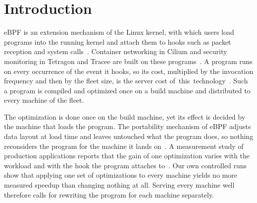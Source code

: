 \section{Introduction}

eBPF is an extension mechanism of the Linux kernel, with which users load programs into the running kernel and attach them to hooks such as packet reception and system calls~\cite{gbadamosi2024ebpf}.
Container networking in Cilium and security monitoring in Tetragon and Tracee are built on these programs~\cite{cilium,tetragon,doerrfeld2026ebpf}.
A program runs on every occurrence of the event it hooks, so its cost, multiplied by the invocation frequency and then by the fleet size, is the server cost of~this~technology~\cite{xu2021synthesizing,doerrfeld2026ebpf}.
Such a program is compiled and optimized once on a build machine and distributed to every machine of the fleet.

The optimization is done once on the build machine, yet its effect is decided by the machine that loads the program.
The portability mechanism of eBPF adjusts data layout at load time and leaves untouched what the program does, so nothing reconsiders the program for the machine it lands on~\cite{llvm-bpf-reloc}.
A measurement study of production applications reports that the gain of one optimization varies with the workload and with the hook the program attaches to~\cite{shahinfar2025demystifying}.
Our own controlled runs show that applying one set of optimizations to every machine yields no more measured speedup than changing nothing at all.
Serving every machine well therefore calls for rewriting the program for each machine separately.

